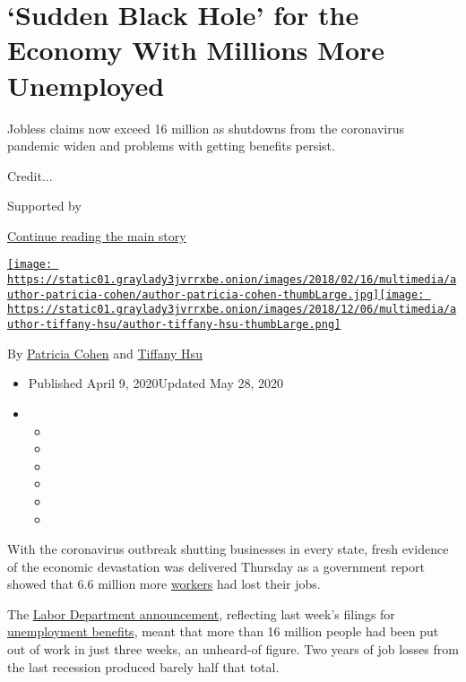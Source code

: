 \hypertarget{sudden-black-hole-for-the-economy-with-millions-more-unemployed}{%
\section{`Sudden Black Hole' for the Economy With Millions More
Unemployed}\label{sudden-black-hole-for-the-economy-with-millions-more-unemployed}}

Jobless claims now exceed 16 million as shutdowns from the coronavirus
pandemic widen and problems with getting benefits persist.

Credit...

Supported by

\protect\hyperlink{after-sponsor}{Continue reading the main story}

\href{https://www.nytimes3xbfgragh.onion/by/patricia-cohen}{\texttt{[image: https://static01.graylady3jvrrxbe.onion/images/2018/02/16/multimedia/author-patricia-cohen/author-patricia-cohen-thumbLarge.jpg]}}\href{https://www.nytimes3xbfgragh.onion/by/tiffany-hsu}{\texttt{[image: https://static01.graylady3jvrrxbe.onion/images/2018/12/06/multimedia/author-tiffany-hsu/author-tiffany-hsu-thumbLarge.png]}}

By \href{https://www.nytimes3xbfgragh.onion/by/patricia-cohen}{Patricia
Cohen} and
\href{https://www.nytimes3xbfgragh.onion/by/tiffany-hsu}{Tiffany Hsu}

\begin{itemize}
\item
  Published April 9, 2020Updated May 28, 2020
\item
  \begin{itemize}
  \item
  \item
  \item
  \item
  \item
  \item
  \end{itemize}
\end{itemize}

With the coronavirus outbreak shutting businesses in every state, fresh
evidence of the economic devastation was delivered Thursday as a
government report showed that 6.6 million more
\href{https://www.nytimes3xbfgragh.onion/article/self-employed-workers-unemployment-coronavirus-stimulus-package.html}{workers}
had lost their jobs.

The \href{https://www.dol.gov/ui/data.pdf}{Labor Department
announcement}, reflecting last week's filings for
\href{https://www.nytimes3xbfgragh.onion/2020/07/23/business/economy/unemployment-benefits.html}{unemployment
benefits}, meant that more than 16 million people had been put out of
work in just three weeks, an unheard-of figure. Two years of job losses
from the last recession produced barely half that total.

